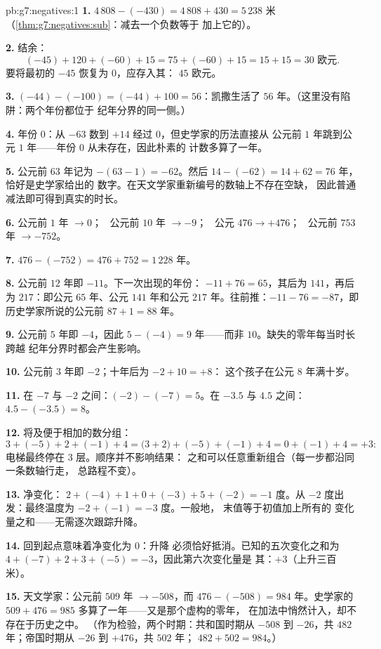 \begin{solution}{pb:g7:negatives:1}
\textbf{1.} $4\,808 - (-430) = 4\,808 + 430 = 5\,238$ 米
（\cref{thm:g7:negatives:sub}：减去一个负数等于
加上它的）。

\textbf{2.} 结余：
\[
(-45) + 120 + (-60) + 15 = 75 + (-60) + 15 = 15 + 15 = 30
\text{ 欧元}.
\]
要将最初的 $-45$ 恢复为 $0$，应存入其：
$45$ 欧元。

\textbf{3.} $(-44) - (-100) = (-44) + 100 = 56$：凯撒生活了
$56$ 年。（这里没有陷阱：两个年份都位于
纪年分界的同一侧。）

\textbf{4.} 年份 $0$：从 $-63$ 数到 $+14$ 经过
$0$，但史学家的历法直接从
公元前 $1$ 年跳到公元 $1$ 年——年份 $0$ 从未存在，因此朴素的
计数多算了一年。

\textbf{5.} 公元前 $63$ 年记为 $-(63 - 1) = -62$。然后
$14 - (-62) = 14 + 62 = 76$ 年，恰好是史学家给出的
数字。在天文学家重新编号的数轴上不存在空缺，
因此普通减法即可得到真实的时长。

\textbf{6.} 公元前 $1$ 年 $\to 0$； \ 公元前 $10$ 年 $\to -9$； \ 公元
$476 \to +476$； \ 公元前 $753$ 年 $\to -752$。

\textbf{7.} $476 - (-752) = 476 + 752 = 1\,228$ 年。

\textbf{8.} 公元前 $12$ 年即 $-11$。下一次出现的年份：
$-11 + 76 = 65$，其后为 $141$，再后为 $217$：即公元 $65$ 年、公元
$141$ 年和公元 $217$ 年。往前推：$-11 - 76 = -87$，即
历史学家所说的公元前 $87 + 1 = 88$ 年。

\textbf{9.} 公元前 $5$ 年即 $-4$，因此 $5 - (-4) = 9$ 年——而非
$10$。缺失的零年每当时长跨越
纪年分界时都会产生影响。

\textbf{10.} 公元前 $3$ 年即 $-2$；十年后为 $-2 + 10 = +8$：
这个孩子在公元 $8$ 年满十岁。

\textbf{11.} 在 $-7$ 与 $-2$ 之间：$(-2) - (-7) = 5$。在
$-3.5$ 与 $4.5$ 之间：$4.5 - (-3.5) = 8$。

\textbf{12.} 将及便于相加的数分组：
\[
3 + (-5) + 2 + (-1) + 4
= \bigl(3 + 2\bigr) + (-5) + (-1) + 4
= 0 + (-1) + 4 = +3 :
\]
电梯最终停在 $3$ 层。顺序并不影响结果：
之和可以任意重新组合（每一步都沿同一条数轴行走，
总路程不变）。

\textbf{13.} 净变化：
$2 + (-4) + 1 + 0 + (-3) + 5 + (-2) = -1$ 度。从
$-2$ 度出发：最终温度为 $-2 + (-1) = -3$ 度。一般地，
末值等于初值加上所有的
变化量之和——无需逐次跟踪升降。

\textbf{14.} 回到起点意味着净变化为 $0$：升降
必须恰好抵消。已知的五次变化之和为
$4 + (-7) + 2 + 3 + (-5) = -3$，因此第六次变化量是
其：$+3$（上升三百米）。

\textbf{15.} 天文学家：公元前 $509$ 年 $\to -508$，而
$476 - (-508) = 984$ 年。史学家的 $509 + 476 = 985$
多算了一年——又是那个虚构的零年，
在加法中悄然计入，却不存在于历史之中。
（作为检验，两个时期：共和国时期从 $-508$ 到 $-26$，共 $482$
年；帝国时期从 $-26$ 到 $+476$，共 $502$ 年；
$482 + 502 = 984$。）
\end{solution}
